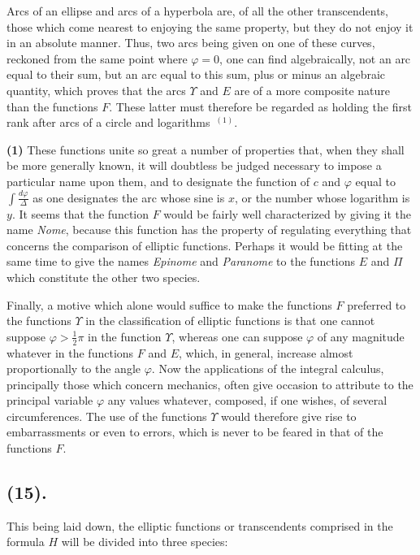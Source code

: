 \documentclass{article}
\begin{document}
Arcs of an ellipse and arcs of a hyperbola are, of all the other transcendents, those which come nearest to enjoying the same property, but they do not enjoy it in an absolute manner. Thus, two arcs being given on one of these curves, reckoned from the same point where $\varphi=0$, one can find algebraically, not an arc equal to their sum, but an arc equal to this sum, plus or minus an algebraic quantity, which proves that the arcs $\Upsilon$ and $E$ are of a more composite nature than the functions $F$. These latter must therefore be regarded as holding the first rank after arcs of a circle and logarithms~${}^{(1)}$.

\textbf{(1)} These functions unite so great a number of properties that, when they shall be more generally known, it will doubtless be judged necessary to impose a particular name upon them, and to designate the function of $c$ and $\varphi$ equal to $\displaystyle\int\frac{d\varphi}{\Delta}$ as one designates the arc whose sine is $x$, or the number whose logarithm is $y$. It seems that the function $F$ would be fairly well characterized by giving it the name \emph{Nome}, because this function has the property of regulating everything that concerns the comparison of elliptic functions. Perhaps it would be fitting at the same time to give the names \emph{Epinome} and \emph{Paranome} to the functions $E$ and $\Pi$ which constitute the other two species.


Finally, a motive which alone would suffice to make the functions $F$ preferred to the functions $\Upsilon$ in the classification of elliptic functions is that one cannot suppose $\varphi>\tfrac{1}{2}\pi$ in the function $\Upsilon$, whereas one can suppose $\varphi$ of any magnitude whatever in the functions $F$ and $E$, which, in general, increase almost proportionally to the angle $\varphi$. Now the applications of the integral calculus, principally those which concern mechanics, often give occasion to attribute to the principal variable $\varphi$ any values whatever, composed, if one wishes, of several circumferences. The use of the functions $\Upsilon$ would therefore give rise to embarrassments or even to errors, which is never to be feared in that of the functions $F$.

\subsection*{(15).}

This being laid down, the elliptic functions or transcendents comprised in the formula $H$ will be divided into three species:
\end{document}

